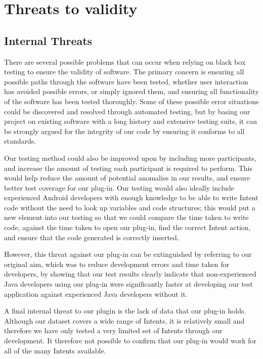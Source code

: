 \section{Threats to validity}

\subsection{Internal Threats}
There are several possible problems that can occur when relying on black box testing to ensure the validity of software. The primary concern is ensuring all possible paths through the software have been tested, whether user interaction has avoided possible errors, or simply ignored them, and ensuring all functionality of the software has been tested thoroughly. Some of these possible error situations could be discovered and resolved through automated testing, but by basing our project on existing software with a long history and extensive testing suits, it can be strongly argued for the integrity of our code by ensuring it conforms to all standards.

Our testing method could also be improved upon by including more participants, and increase the amount of testing each participant is required to perform. This would help reduce the amount of potential anomalies in our results, and ensure better test coverage for our plug-in. Our testing would also ideally include experienced Android developers with enough knowledge to be able to write Intent code without the need to look up variables and code structures; this would put a new element into our testing so that we could compare the time taken to write code, against the time taken to open our plug-in, find the correct Intent action, and ensure that the code generated is correctly inserted.

However, this threat against our plug-in can be extinguished by referring to our original aim, which was to reduce development errors and time taken for developers, by showing that our test results clearly indicate that non-experienced Java developers using our plug-in were significantly faster at developing our test application against experienced Java developers without it.

A final internal threat to our plugin is the lack of data that our plug-in holds. Although our dataset covers a wide range of Intents, it is relatively small and therefore we have only tested a very limited set of Intents through our development. It therefore not possible to confirm that our plug-in would work for all of the many Intents available.

